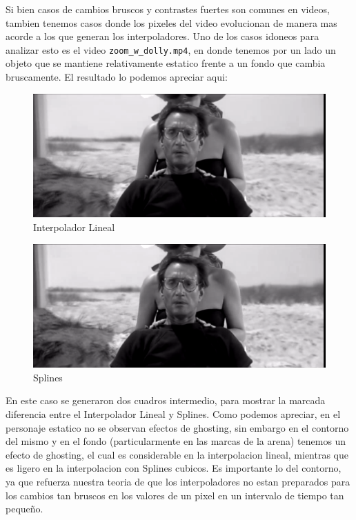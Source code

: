 Si bien casos de cambios bruscos y contrastes fuertes son comunes en videos, tambien tenemos casos donde los pixeles del video evolucionan de manera mas acorde a los que generan los interpoladores. Uno de los casos idoneos para analizar esto es el video \texttt{zoom\_w\_dolly.mp4}, en donde tenemos por un lado un objeto que se mantiene relativamente estatico frente a un fondo que cambia bruscamente. El resultado lo podemos apreciar aqui:

\begin{figure}[h]
\centering
  \begin{minipage}[b]{.9\textwidth}
    \includegraphics[width=\textwidth]{imagenes/zwdLineal.png}
    \caption{Interpolador Lineal}
  \end{minipage}
\end{figure}

\newpage

\begin{figure}[h]
\centering
  \begin{minipage}[b]{.9\textwidth}
    \includegraphics[width=\textwidth]{imagenes/zwdSplines.png}
    \caption{Splines}
  \end{minipage}
\end{figure}

En este caso se generaron dos cuadros intermedio, para mostrar la marcada diferencia entre el Interpolador Lineal y Splines. Como podemos apreciar, en el personaje estatico no se observan efectos de ghosting, sin embargo en el contorno del mismo y en el fondo (particularmente en las marcas de la arena) tenemos un efecto de ghosting, el cual es considerable en la interpolacion lineal, mientras que es ligero en la interpolacion con Splines cubicos. Es importante lo del contorno, ya que refuerza nuestra teoria de que los interpoladores no estan preparados para los cambios tan bruscos en los valores de un pixel en un intervalo de tiempo tan pequeño.

